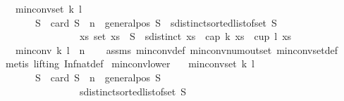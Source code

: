 \begin{isabellebody}
\ \ \ {\isachardoublequoteopen}min{\isacharunderscore}{\kern0pt}conv{\isacharunderscore}{\kern0pt}set\ k\ l\ {\isasymnoteq}\ {\isacharbraceleft}{\kern0pt}{\isacharbraceright}{\kern0pt}{\isachardoublequoteclose}\isanewline
\ \ \ \ \ \ \ {\isachardoublequoteopen}{\isasymexists}S{\isachardot}{\kern0pt}\ \ card\ S\ {\isasymge}\ n\ {\isasymand}\ general{\isacharunderscore}{\kern0pt}pos\ S\ {\isasymand}\ sdistinct{\isacharparenleft}{\kern0pt}sorted{\isacharunderscore}{\kern0pt}list{\isacharunderscore}{\kern0pt}of{\isacharunderscore}{\kern0pt}set\ S{\isacharparenright}{\kern0pt}\ {\isasymand}\ \isanewline
\ \ \ \ \ \ \ \ \ \ \ \ \ \ \ \ {\isacharparenleft}{\kern0pt}{\isasymforall}xs{\isachardot}{\kern0pt}\ set\ xs\ {\isasymsubseteq}\ S\ {\isasymand}\ sdistinct\ xs\ {\isasymlongrightarrow}\ {\isasymnot}{\isacharparenleft}{\kern0pt}cap\ k\ xs\ {\isasymor}\ cup\ l\ xs{\isacharparenright}{\kern0pt}{\isacharparenright}{\kern0pt}{\isachardoublequoteclose}\isanewline
\ \ \ {\isachardoublequoteopen}min{\isacharunderscore}{\kern0pt}conv\ k\ l\ {\isasymnoteq}\ n{\isachardoublequoteclose}\isanewline
%
\isadelimproof
\ \ %
\endisadelimproof
%
\isatagproof
{}\isamarkupfalse%
\ assms\ min{\isacharunderscore}{\kern0pt}conv{\isacharunderscore}{\kern0pt}def\ min{\isacharunderscore}{\kern0pt}conv{\isacharunderscore}{\kern0pt}num{\isacharunderscore}{\kern0pt}out{\isacharunderscore}{\kern0pt}set\ min{\isacharunderscore}{\kern0pt}conv{\isacharunderscore}{\kern0pt}set{\isacharunderscore}{\kern0pt}def\isanewline
\ \ \isamarkupfalse%
\ {\isacharparenleft}{\kern0pt}metis\ {\isacharparenleft}{\kern0pt}lifting{\isacharparenright}{\kern0pt}\ Inf{\isacharunderscore}{\kern0pt}nat{\isacharunderscore}{\kern0pt}def{}{\isacharparenright}{\kern0pt}%
\endisatagproof
{\isafoldproof}%
%
\isadelimproof
\isanewline
%
\endisadelimproof
\isanewline
{}\isamarkupfalse%
\ min{\isacharunderscore}{\kern0pt}conv{\isacharunderscore}{\kern0pt}lower{\isacharcolon}{\kern0pt}\isanewline
\ \ \ {\isachardoublequoteopen}min{\isacharunderscore}{\kern0pt}conv{\isacharunderscore}{\kern0pt}set\ k\ l\ {\isasymnoteq}\ {\isacharbraceleft}{\kern0pt}{\isacharbraceright}{\kern0pt}{\isachardoublequoteclose}\isanewline
\ \ \ \ \ \ \ {\isachardoublequoteopen}{\isasymexists}S{\isachardot}{\kern0pt}\ \ card\ S\ {\isacharequal}{\kern0pt}\ n\ {\isasymand}\ general{\isacharunderscore}{\kern0pt}pos\ S\ {\isasymand}\ \isanewline
\ \ \ \ \ \ \ \ \ \ \ \ \ \ \ \ sdistinct{\isacharparenleft}{\kern0pt}sorted{\isacharunderscore}{\kern0pt}list{\isacharunderscore}{\kern0pt}of{\isacharunderscore}{\kern0pt}set\ S{\isacharparenright}{\kern0pt}\ {\isasymand}\ \isanewline

\end{isabellebody}
